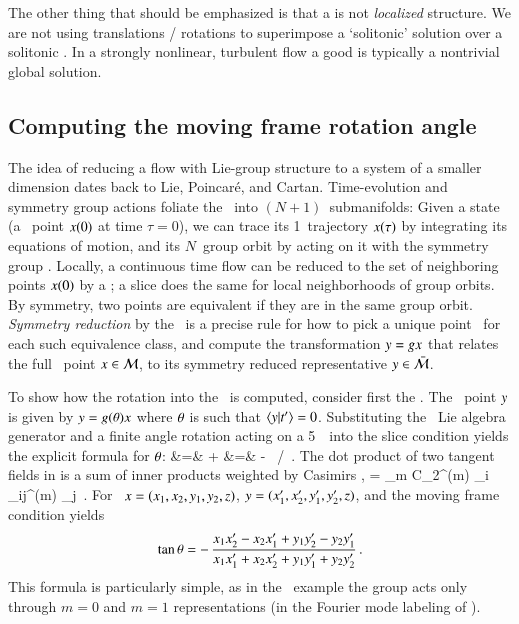 The other thing that should be emphasized is that a {\template} is not
{\em localized} structure. We are not using translations / rotations to
superimpose a `solitonic' solution over a solitonic {\template}. In
a strongly nonlinear, turbulent flow a good {\template} is typically a
nontrivial global solution.

\subsection{Computing the moving frame rotation angle}
\label{exam:CLErotAngle}

															\toCB
The idea of reducing a flow with Lie-group structure to a system of
a smaller dimension dates back to Lie, Poincar\'e, and Cartan.
Time-evolution and symmetry group actions foliate the \statesp\ into
$(N\!+\!1)$\dmn\ submanifolds: Given a state (a \statesp\ point $x(0)$
at time $\tau=0$), we can trace its  1\dmn\ trajectory $x(\tau)$ by
integrating its equations of motion, and its $N$\dmn\ group orbit by
acting on it with the symmetry group \Group. Locally, a continuous time
flow can be reduced to the set of neighboring points $x(0)$ by a
\PoincSec; a slice does the same for local neighborhoods of group orbits.
By symmetry, two points are equivalent if they are in the same group
orbit. {\em Symmetry reduction} by the \mframes\ is a precise rule for
how to pick a unique point \sspRed\ for each such equivalence class, and
compute the transformation $y =g x$ that relates the full
\statesp\ point  $x \in {\cal M}$, to its symmetry reduced representative
$y \in \bar{\cal M}$.

To show how the rotation into the \slice\ is computed, consider first the
\cLe. The \reducedsp\ point $y$ is given by
$y=g({\bf \theta}) x$ where ${\bf \theta}$ is such that
$\braket{\sspRed}{\sliceTan{}}=0$. Substituting the \ Lie algebra
generator and a finite angle  rotation  acting on a
5\dmn\ \statesp\ into the slice condition 
yields the explicit formula for ${\bf \theta}$:
 &=&
    \braket{\ssp}{\sliceTan{}}\cos\gSpace
    +\braket{\groupTan_{}(\ssp)}{\sliceTan{}} \sin\gSpace
	\continue %
\tan\gSpace &=&
   - \, {\braket{\ssp}{\sliceTan{}}}/
          {\braket{\groupTan_{}(\ssp)}{\sliceTan{}}}
\,.
\label{SL:CLEsliceRot}
\eea
The dot product of two tangent fields in  is a
sum of inner products weighted by Casimirs ,
\beq
\braket{\groupTan(\sspRed)}{\groupTan(\slicep)}
   = \sum_m C_2^{(m)} {\sspRed}_i\, \delta_{ij}^{(m)} \slicep_j
\,.
For \cLe\
$\ssp = (x_1,x_2,y_1,y_2,z)$,
$\sspRed = (x_1',x_2',y_1',y_2',z)$,
and the moving frame condition  yields
\[
\tan\gSpace =
- \, \frac{x_1 x_2'-x_2 x_1'+y_1 y_2' -y_2 y_1'}
       {x_1 x'_1+x_2 x'_2+y_1 y'_1+y_2 y'_2}
\,.
\]
This formula is particularly simple, as in the \cLe\
example the group acts only through $m=0$ and $m=1$ representations
(in the Fourier mode labeling of ).

